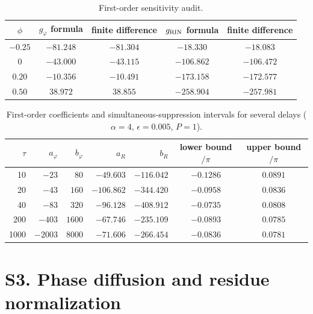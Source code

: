 \documentclass[11pt]{article}
\newif\ifmarked
\newcommand{\rev}[1]{\ifmarked{\color{blue}#1}\else#1\fi}
\newenvironment{revised}{\ifmarked\color{blue}\fi}{}
\begin{document}
\begin{table}[h]
\centering
\caption{First-order sensitivity audit.}\label{tab:fdaudit}
\begin{tabular}{ccccc}
\toprule
$\phi$ & $g_\varphi$ formula & finite difference & $g_{\rm RIN}$ formula & finite difference\\
\midrule
$-0.25$ & $-81.248$ & $-81.304$ & $-18.330$ & $-18.083$\\
$0$ & $-43.000$ & $-43.115$ & $-106.862$ & $-106.472$\\
$0.20$ & $-10.356$ & $-10.491$ & $-173.158$ & $-172.577$\\
$0.50$ & $38.972$ & $38.855$ & $-258.904$ & $-257.981$\\
\bottomrule
\end{tabular}
\end{table}

\begin{table}[h]
\centering
\caption{\rev{First-order coefficients and simultaneous-suppression intervals for several delays ($\alpha=4$, $\epsilon=0.005$, $P=1$).}}
\label{tab:fo}
\begin{revised}
\begin{tabular}{rrrrrcc}
\toprule
$\tau$ & $a_\varphi$ & $b_\varphi$ & $a_R$ & $b_R$ & lower bound$/\pi$ & upper bound$/\pi$\\
\midrule
10 & $-23$ & $80$ & $-49.603$ & $-116.042$ & $-0.1286$ & $0.0891$\\
20 & $-43$ & $160$ & $-106.862$ & $-344.420$ & $-0.0958$ & $0.0836$\\
40 & $-83$ & $320$ & $-96.128$ & $-408.912$ & $-0.0735$ & $0.0808$\\
200 & $-403$ & $1600$ & $-67.746$ & $-235.109$ & $-0.0893$ & $0.0785$\\
1000 & $-2003$ & $8000$ & $-71.606$ & $-266.454$ & $-0.0836$ & $0.0781$\\
\bottomrule
\end{tabular}
\end{revised}
\end{table}

\section*{S3. Phase diffusion and residue normalization}
\end{document}
